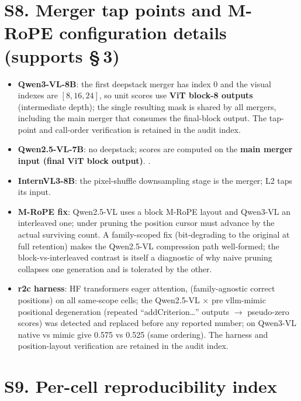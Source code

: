 \documentclass[journal]{IEEEtran}
\begin{document}
\section*{S8. Merger tap points and M-RoPE configuration details (supports \S\,3)}

\begin{itemize}
  \item \textbf{Qwen3-VL-8B}: the first deepstack merger has index 0 and the
    visual indexes are $[8,16,24]$, so unit scores use \textbf{ViT block-8 outputs}
    (intermediate depth); the single resulting mask is shared by all mergers,
    including the main merger that consumes the final-block output. The tap-point
    and call-order verification is retained in the audit index.
  \item \textbf{Qwen2.5-VL-7B}: no deepstack; scores are computed on the
    \textbf{main merger input (final ViT block output)}.
    .
  \item \textbf{InternVL3-8B}: the pixel-shuffle downsampling stage is the
    merger; L2 taps its input.
  \item \textbf{M-RoPE fix}: Qwen2.5-VL uses a block M-RoPE layout and Qwen3-VL
    an interleaved one; under pruning the position cursor must advance by the
    actual surviving count. A family-scoped fix (bit-degrading to the original
    at full retention) makes the Qwen2.5-VL compression path well-formed; the
    block-vs-interleaved contrast is itself a diagnostic of why naive pruning
    collapses one generation and is tolerated by the other.
  \item \textbf{r2c harness}: HF transformers eager attention,
     (family-agnostic correct positions) on all same-scope
    cells; the Qwen2.5-VL $\times$ pre vllm-mimic positional degeneration
    (repeated ``addCriterion\ldots'' outputs $\to$ pseudo-zero scores) was
    detected and replaced before any reported number; on Qwen3-VL native vs
    mimic give 0.575 vs 0.525 (same ordering). The harness and position-layout
    verification are retained in the audit index.
\end{itemize}

\section*{S9. Per-cell reproducibility index}
\end{document}
